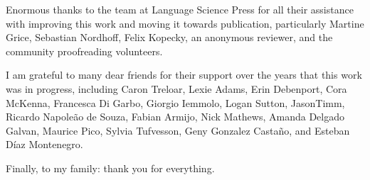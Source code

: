 Enormous thanks to the team at Language Science Press for all their assistance with improving this work and moving it towards publication, particularly Martine Grice, Sebastian Nordhoff, Felix Kopecky, an anonymous reviewer, and the community proofreading volunteers.

I am grateful to many dear friends for their support over the years that this work was in progress, including Caron Treloar, Lexie Adams, Erin Debenport, Cora McKenna, Francesca Di Garbo, Giorgio Iemmolo, Logan Sutton, Jason\linebreak Timm, Ricardo Napoleão de Souza, Fabian Armijo, Nick Mathews, Amanda Delgado Galvan, Maurice Pico, Sylvia Tufvesson, Geny Gonzalez Castaño, and Esteban Díaz Montenegro.

Finally, to my family: thank you for everything.
